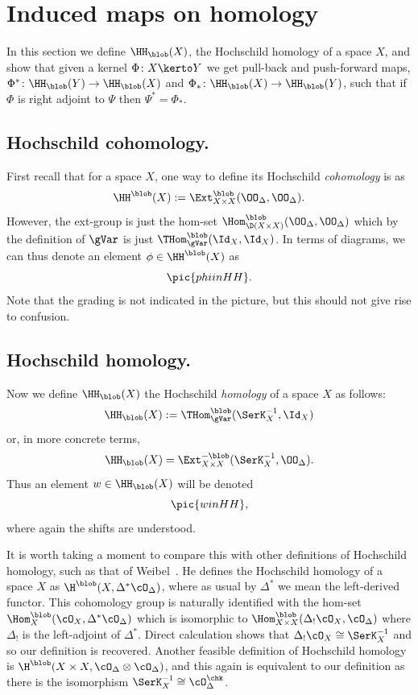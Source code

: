 \section{Induced maps on homology}
\label{sec:defmaps}
In this section we define $\HH_\blob(X)$, the Hochschild homology of a
space $X$, and show that given a kernel $\Phi\colon X\kerto Y$ we get
pull-back and push-forward maps, $\Phi^*\colon \HH_\blob(Y)\to
\HH_\blob(X)$ and $\Phi_*\colon \HH_\blob(X)\to \HH_\blob(Y)$, such
that if $\Phi$ is right adjoint to $\Psi$ then $\Psi^*=\Phi_*$.

 \subsection{Hochschild cohomology.}
First recall that for a space $X$, one way to define its Hochschild
\emph{cohomology} is as
\[\HH^\blob(X):=\Ext_{X\times X}^\blob(\OO_\Delta,\OO_\Delta).\]
However, the ext-group is just the hom-set $\Hom^\blob_{\D(X\times
  X)}(\OO_\Delta,\OO_\Delta)$ which by the definition of $\gVar$ is
just $\THom^\blob_\gVar(\Id_X, \Id_X)$.  In terms of diagrams, we can
thus denote an element $\phi\in \HH^\blob(X)$ as
\[\pic{phiinHH}.\]
Note that the grading is not indicated in the picture, but this should
not give rise to confusion.

 \subsection{Hochschild homology.}
Now we define $\HH_\blob(X)$ the Hochschild \emph{homology} of a space
$X$ as follows:
\[\HH_\blob(X):=\THom_\gVar^\blob(\SerK_X^{-1},\Id_X) \]
or, in more concrete terms, 
\[ \HH_\blob(X) = \Ext_{X\times X}^{-\blob}(\SerK^{-1}_X,\OO_\Delta).\]
Thus an element $w\in \HH_\blob(X)$ will be denoted
\[\pic{winHH},\]
where again the shifts are understood.


It is worth taking a moment to compare this with other definitions of
Hochschild homology, such as that of Weibel~\cite{Weibel}.  He defines
the Hochschild homology of a space $X$ as
$\H^\blob(X,\Delta^*\cO_\Delta)$, where as usual by $\Delta^*$ we mean
the left-derived functor.  This cohomology group is naturally
identified with the hom-set $\Hom^\blob_{X}(\cO_X,\Delta^*\cO_\Delta)$
which is isomorphic to $\Hom^\blob_{X\times
  X}(\Delta_!\cO_X,\cO_\Delta)$ where $\Delta_!$ is the left-adjoint
of $\Delta^*$.  Direct calculation shows that $\Delta_!\cO_X\cong
\SerK_X^{-1}$ and so our definition is recovered.  Another feasible
definition of Hochschild homology is $\H^\blob(X\times
X,\cO_\Delta\otimes \cO_\Delta)$, and this again is equivalent to our
definition as there is the isomorphism $\SerK_X^{-1}\cong
\cO_\Delta^\chk$.

